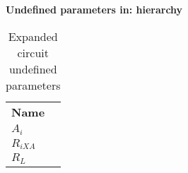 {\textbf{Undefined parameters in: hierarchy}}

\begin{table}[H]
\centering
\begin{tabular}[c]{l}
\textbf{Name} \\ 
\rowcolor{myyellow}
$A_{i}$ \\ 
$R_{i XA}$ \\ 
\rowcolor{myyellow}
$R_{L}$ \\ 
\end{tabular}
\caption{Expanded circuit undefined parameters}
\end{table}

